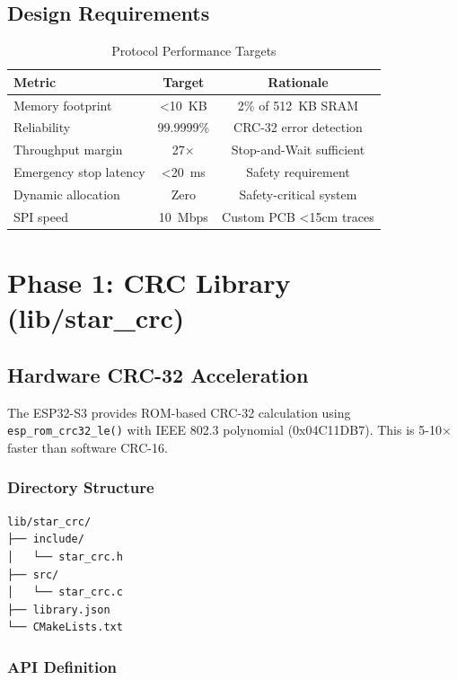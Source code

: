 \documentclass[12pt,letterpaper]{article}
\begin{document}
\subsection{Design Requirements}

\begin{table}[h]
\centering
\caption{Protocol Performance Targets}
\begin{tabular}{lcc}
\toprule
\textbf{Metric} & \textbf{Target} & \textbf{Rationale} \\
\midrule
Memory footprint & <10~KB & 2\% of 512~KB SRAM \\
Reliability & 99.9999\% & CRC-32 error detection \\
Throughput margin & 27× & Stop-and-Wait sufficient \\
Emergency stop latency & <20~ms & Safety requirement \\
Dynamic allocation & Zero & Safety-critical system \\
SPI speed & 10~Mbps & Custom PCB <15cm traces \\
\bottomrule
\end{tabular}
\end{table}

\section{Phase 1: CRC Library (lib/star\_crc)}

\subsection{Hardware CRC-32 Acceleration}

The ESP32-S3 provides ROM-based CRC-32 calculation using \texttt{esp\_rom\_crc32\_le()} with IEEE 802.3 polynomial (0x04C11DB7). This is 5-10× faster than software CRC-16.

\subsubsection{Directory Structure}

\begin{verbatim}
lib/star_crc/
├── include/
│   └── star_crc.h
├── src/
│   └── star_crc.c
├── library.json
└── CMakeLists.txt
\end{verbatim}

\subsubsection{API Definition}
\end{document}
